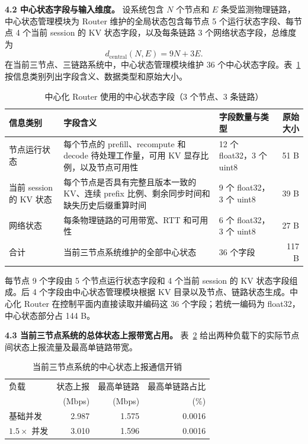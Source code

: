 \textbf{4.2 中心状态字段与输入维度。}
设系统包含 \(N\) 个节点和 \(E\) 条受监测物理链路，中心状态管理模块为 Router 维护的全局状态包含每节点 5 个运行状态字段、每节点 4 个当前 session 的 KV 状态字段，以及每条链路 3 个网络状态字段，总维度为
\[
d_{\mathrm{central}}(N,E)=9N+3E.
\]
在当前三节点、三链路系统中，中心状态管理模块维护 36 个中心状态字段。表~\ref{tab:central-agent-metadata} 按信息类别列出字段含义、数据类型和原始大小。

\begin{table}[H]
\centering
\footnotesize
\caption{中心化 Router 使用的中心状态字段（3 个节点、3 条链路）}
\label{tab:central-agent-metadata}
\begin{tabular}{@{}p{}p{}p{}r@{}}
\toprule
信息类别 & 字段含义 & 字段数量与类型 & 原始大小 \\
\midrule
节点运行状态
& 每个节点的 prefill、recompute 和 decode 待处理工作量，可用 KV 显存比例，以及节点可用性
& 12 个 float32，3 个 uint8
& 51 B \\
当前 session 的 KV 状态
& 每个节点是否具有完整且版本一致的 KV、连续 prefix 比例、剩余同步时间和缺失历史后缀重算时间
& 9 个 float32，3 个 uint8
& 39 B \\
网络状态
& 每条物理链路的可用带宽、RTT 和可用性
& 6 个 float32，3 个 uint8
& 27 B \\
\midrule
合计
& 当前三节点系统维护的全部中心状态
& 36 个字段
& 117 B \\
\bottomrule
\end{tabular}
\end{table}

每节点 9 个字段由 5 个节点运行状态字段和 4 个当前 session 的 KV 状态字段组成。后 4 个字段由中心状态管理模块根据 KV 目录以及节点、链路状态生成。中心化 Router 在控制平面内直接读取并编码这 36 个字段；若统一编码为 float32，中心状态部分占 144 B。

\textbf{4.3 当前三节点系统的总体状态上报带宽占用。}
表~\ref{tab:control-plane-overhead} 给出两种负载下的实际节点间状态上报流量及最高单链路带宽。

\begin{table}[H]
\centering
\small
\caption{当前三节点系统的中心状态上报通信开销}
\label{tab:control-plane-overhead}
\begin{tabular}{@{}lrrr@{}}
\toprule
负载
& 状态上报
& 最高单链路
& 最高单链路占比 \\
& (Mbps) & (Mbps) & (\%) \\
\midrule
基础并发
& 2.987 & 1.575 & 0.0016 \\
\(1.5\times\) 并发
& 3.010 & 1.596 & 0.0016 \\
\bottomrule
\end{tabular}
\end{table}

